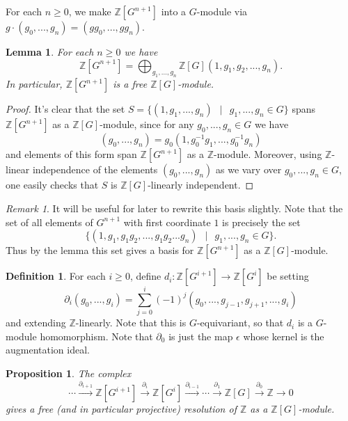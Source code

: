 \documentclass[11pt]{amsart}
\numberwithin{equation}{section}
\newtheorem{lemma}[equation]{Lemma}
\newtheorem{proposition}[equation]{Proposition}
\theoremstyle{remark}
\newtheorem{remark}[equation]{Remark}
\theoremstyle{remark}
\theoremstyle{remark}
\theoremstyle{definition}
\theoremstyle{definition}
\theoremstyle{definition}
\newtheorem{defi}[equation]{Definition}
\theoremstyle{definition}
\theoremstyle{definition}
\theoremstyle{definition}
\begin{document}
For each $n\geq 0$, we make $\mathbb{Z}[G^{n+1}]$ into a $G$-module via $g\cdot (g_0,...,g_n)=(gg_0,...,gg_n)$.

\begin{lemma}\label{freeness}
For each $n\geq 0$ we have
\[\mathbb{Z}[G^{n+1}]=\bigoplus_{g_1,...,g_n}\mathbb{Z}[G](1,g_1,g_2,...,g_n).\]
In particular, $\mathbb{Z}[G^{n+1}]$ is a free $\mathbb{Z}[G]$-module.
\end{lemma}

\begin{proof}
It's clear that the set $S=\{(1,g_1,...,g_n)~~\mid~~g_1,...,g_n\in G\}$ spans $\mathbb{Z}[G^{n+1}]$ as a $\mathbb{Z}[G]$-module, since for any $g_0,...,g_n\in G$ we have
\[(g_0,...,g_n)=g_0(1,g_0^{-1}g_1,...,g_0^{-1}g_{n})\]
and elements of this form span $\mathbb{Z}[G^{n+1}]$ as a $\mathbb{Z}$-module. Moreover, using $\mathbb{Z}$-linear independence of the elements $(g_0,...,g_n)$ as we vary over $g_0,...,g_n\in G$, one easily checks that $S$ is $\mathbb{Z}[G]$-linearly independent.
\end{proof}

\begin{remark} \label{basis for G remark}
It will be useful for later to rewrite this basis slightly. Note that the set of all elements of $G^{n+1}$ with first coordinate $1$ is precisely the set
\[\{(1,g_1,g_1g_2,...,g_1g_2...g_n)~~\mid~~g_1,...,g_n\in G\}.\]
Thus by the lemma this set gives a basis for $\mathbb{Z}[G^{n+1}]$ as a $\mathbb{Z}[G]$-module.
\end{remark}

\begin{defi}
For each $i\geq 0$, define $d_i:\mathbb{Z}[G^{i+1}]\rightarrow \mathbb{Z}[G^i]$ be setting
\[\partial_i(g_0,...,g_i)=\sum_{j=0}^i (-1)^j(g_0,...,g_{j-1},g_{j+1},...,g_i)\]
and extending $\mathbb{Z}$-linearly. Note that this is $G$-equivariant, so that $d_i$ is a $G$-module homomorphism. Note that $\partial_0$ is just the map $\epsilon$ whose kernel is the augmentation ideal.
\end{defi}

\begin{proposition} \label{standard resolution}
The complex
\[\cdots \stackrel{\partial_{i+1}}{\longrightarrow} \mathbb{Z}[G^{i+1}] \stackrel{\partial_i}{\longrightarrow} \mathbb{Z}[G^i] \stackrel{\partial_{i-1}}{\longrightarrow} \cdots \stackrel{\partial_1}{\longrightarrow} \mathbb{Z}[G]\stackrel{\partial_0}{\longrightarrow} \mathbb{Z} \longrightarrow 0\]
gives a free (and in particular projective) resolution of $\mathbb{Z}$ as a $\mathbb{Z}[G]$-module.
\end{proposition}
\end{document}

